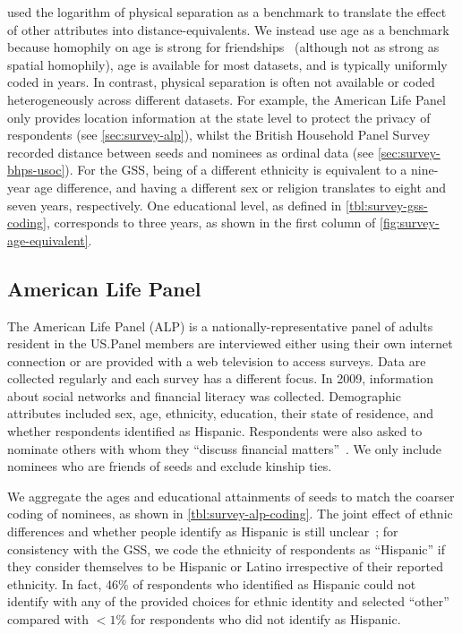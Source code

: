 \documentclass{scrartcl}
\begin{document}
\textcite{Hipp2009} used the logarithm of physical separation as a benchmark to translate the effect of other attributes into distance-equivalents. We instead use age as a benchmark because homophily on age is strong for friendships~\cite{McPherson2001} (although not as strong as spatial homophily), age is available for most datasets, and is typically uniformly coded in years. In contrast, physical separation is often not available or coded heterogeneously across different datasets. For example, the American Life Panel only provides location information at the state level to protect the privacy of respondents (see \cref{sec:survey-alp}), whilst the British Household Panel Survey recorded distance between seeds and nominees as ordinal data (see \cref{sec:survey-bhps-usoc}). For the GSS, being of a different ethnicity is equivalent to a nine-year age difference, and having a different sex or religion translates to eight and seven years, respectively. One educational level, as defined in \cref{tbl:survey-gss-coding}, corresponds to three years, as shown in the first column of \cref{fig:survey-age-equivalent}.

\subsection{American Life Panel\label{sec:survey-alp}}

The American Life Panel (ALP) is a nationally-representative panel of adults resident in the US.\@ Panel members are interviewed either using their own internet connection or are provided with a web television to access surveys. Data are collected regularly and each survey has a different focus. In 2009, information about social networks and financial literacy was collected. Demographic attributes included sex, age, ethnicity, education, their state of residence, and whether respondents identified as Hispanic. Respondents were also asked to nominate others with whom they ``discuss financial matters''~\cite{Mihaly2009}. We only include nominees who are friends of seeds and exclude kinship ties.

We aggregate the ages and educational attainments of seeds to match the coarser coding of nominees, as shown in \cref{tbl:survey-alp-coding}. The joint effect of ethnic differences and whether people identify as Hispanic is still unclear~\cite{Smith2017a}; for consistency with the GSS, we code the ethnicity of respondents as ``Hispanic'' if they consider themselves to be Hispanic or Latino irrespective of their reported ethnicity. In fact, 46\% of respondents who identified as Hispanic could not identify with any of the provided choices for ethnic identity and selected ``other'' compared with $<1\%$ for respondents who did not identify as Hispanic.
\end{document}
